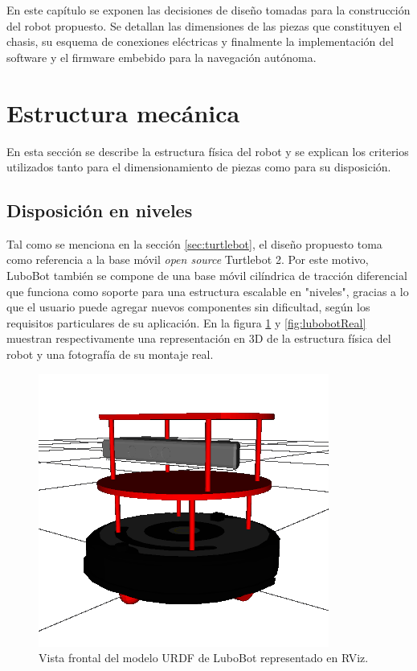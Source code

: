 \label{Capitulo3}

En este capítulo se exponen las decisiones de diseño tomadas para la construcción del robot propuesto. Se detallan las dimensiones de las piezas que constituyen el chasis, su esquema de conexiones eléctricas y finalmente la implementación del software y el firmware embebido para la navegación autónoma.

\section{Estructura mecánica}

En esta sección se describe la estructura física del robot y se explican los criterios utilizados tanto para el dimensionamiento de piezas como para su disposición.

\subsection{Disposición en niveles}
Tal como se menciona en la sección \ref{sec:turtlebot}, el diseño propuesto toma como referencia a la base móvil \textit{open source} Turtlebot 2. Por este motivo, LuboBot también se compone de una base móvil cilíndrica de tracción diferencial que funciona como soporte para una estructura escalable en "niveles", gracias a lo que el usuario puede agregar nuevos componentes sin dificultad, según los requisitos particulares de su aplicación. En la figura \ref{fig:lubobotURDF} y \ref{fig:lubobotReal} muestran respectivamente una representación en 3D de la estructura física del robot y una fotografía de su montaje real.

\begin{figure}[ht]
  \centering
  \includegraphics[scale=0.5]{./Figures/lubobot_urdf.png}
  \caption{Vista frontal del modelo URDF de LuboBot representado en RViz.}
  \label{fig:lubobotURDF}
\end{figure}

